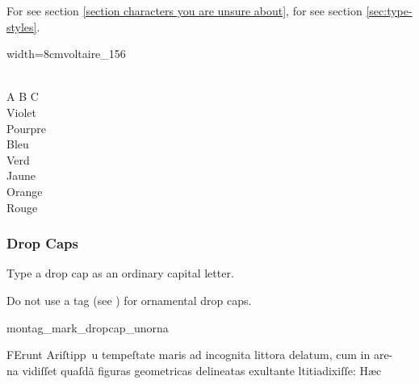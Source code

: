 \begin{crossref}
For  see section \ref{section characters you are unsure about}, for  see section \ref{sec:type-styles}.
\end{crossref}


\begin{sampleImageSmall}{width=8cm}{voltaire_156}
\begin{typeLatin}
 \\
A B C \\
Violet \\
Pourpre \\
Bleu \\
Verd \\
Jaune \\
Orange \\
Rouge \\
\end{typeLatin}
\end{sampleImageSmall}

\subsubsection{Drop Caps}
\label{section drop caps}

\begin{mainrule}
Type a drop cap as an ordinary capital letter.
\end{mainrule}

\begin{clarification}
Do not use a  tag (see ) for ornamental drop caps.
\end{clarification}

\vspace{2mm}
\begin{sampleImage}{montag_mark_dropcap_unorna}
\begin{typeLatin}
FErunt Ariſtipp\bs~u tempeſtate maris ad incognita littora delatum, cum in are- \\
na vidiſſet quaſdã figuras geometricas delineatas exultant\bs\tld{}e ltitia\lwr dixiſſe: Hæc \\
\someText {}
\end{typeLatin}
\end{sampleImage}

